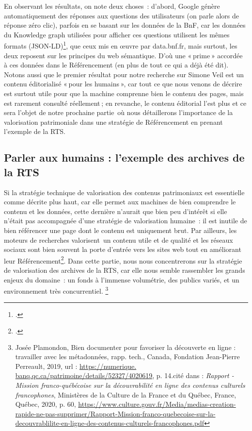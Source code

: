 En observant les résultats, on note deux choses : d’abord, Google génère automatiquement des réponses aux questions des utilisateurs (on parle alors de réponse zéro clic), parfois en se basant sur les données de la BnF, car les données du Knowledge graph utilisées pour afficher ces questions utilisent les mêmes formats (JSON-LD)\footcite{zotero-235}, que ceux mis en œuvre par data.bnf.fr, mais surtout, les deux reposent sur les principes du web sémantique. D’où une « prime » accordée à ces données dans le Référencement (en plus de tout ce qui a déjà été dit). Notons aussi que le premier résultat pour notre recherche sur Simone Veil est un contenu éditorialisé « pour les humains », car tout ce que nous venons de décrire est surtout utile pour que la machine comprenne bien le contenu des pages, mais est rarement consulté réellement ; en revanche, le contenu éditorial l’est plus et ce sera l’objet de notre prochaine partie où nous détaillerons l’importance de la valorisation patrimoniale dans une stratégie de Référencement en prenant l’exemple de la RTS.

\subsection{Parler aux humains : l'exemple des archives de la RTS}

Si la stratégie technique de valorisation des contenus patrimoniaux est essentielle comme décrite plus haut, car elle permet aux machines de bien comprendre le contenu et les données, cette dernière n’aurait que bien peu d’intérêt si elle n’était pas accompagnée d’une stratégie de valorisation humaine : il est inutile de bien référencer une page dont le contenu est uniquement brut. Par ailleurs, les moteurs de recherches valorisent un contenu utile et de qualité et les réseaux sociaux sont bien souvent la porte d’entrée vers les sites web tout en améliorant leur Référencement\footcite{laura2022}. Dans cette partie, nous nous concentrerons sur la stratégie de valorisation des archives de la RTS, car elle nous semble rassembler les grands enjeux du domaine : un fonds à l’immense volumétrie, des publics variés, et un environnement très concurrentiel.
\footnote{Josée Plamondon, Bien documenter pour favoriser la découverte en ligne : travailler avec les métadonnées, rapp. tech., Canada, Fondation Jean-Pierre Perreault, 2019, url : \url{https://numerique.
		banq.qc.ca/patrimoine/details/52327/4020619}, p. 14.cité dans : \textit{Rapport - Mission franco-québécoise sur la découvrabilité en ligne des contenus culturels francophones}, Ministères de la Culture de la France et du Québec, France, Québec, 2020, p. 60, \url{https://www.culture.gouv.fr/Media/medias-creation-rapide-ne-pas-supprimer/Rapport-Mission-franco-quebecoise-sur-la-decouvrablilite-en-ligne-des-contenus-culturels-francophones.pdf}}



